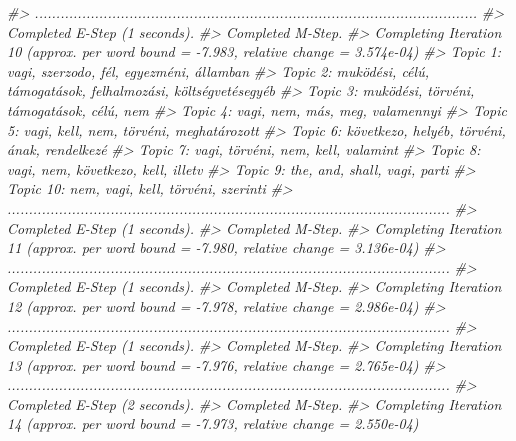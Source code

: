 \documentclass[
]{book}
\newenvironment{Shaded}{\begin{snugshade}}{\end{snugshade}}
\newcommand{\CommentTok}[1]{\textcolor[rgb]{0.56,0.35,0.01}{\textit{#1}}}
\begin{document}
\begin{Shaded}
\begin{Highlighting}[]
\CommentTok{\#\textgreater{} .......................................................................................................}
\CommentTok{\#\textgreater{} Completed E{-}Step (1 seconds). }
\CommentTok{\#\textgreater{} Completed M{-}Step. }
\CommentTok{\#\textgreater{} Completing Iteration 10 (approx. per word bound = {-}7.983, relative change = 3.574e{-}04) }
\CommentTok{\#\textgreater{} Topic 1: vagi, szerzodo, fél, egyezméni, államban }
\CommentTok{\#\textgreater{}  Topic 2: muködési, célú, támogatások, felhalmozási, költségvetésegyéb }
\CommentTok{\#\textgreater{}  Topic 3: muködési, törvéni, támogatások, célú, nem }
\CommentTok{\#\textgreater{}  Topic 4: vagi, nem, más, meg, valamennyi }
\CommentTok{\#\textgreater{}  Topic 5: vagi, kell, nem, törvéni, meghatározott }
\CommentTok{\#\textgreater{}  Topic 6: következo, helyéb, törvéni, ának, rendelkezé }
\CommentTok{\#\textgreater{}  Topic 7: vagi, törvéni, nem, kell, valamint }
\CommentTok{\#\textgreater{}  Topic 8: vagi, nem, következo, kell, illetv }
\CommentTok{\#\textgreater{}  Topic 9: the, and, shall, vagi, parti }
\CommentTok{\#\textgreater{}  Topic 10: nem, vagi, kell, törvéni, szerinti }
\CommentTok{\#\textgreater{} .......................................................................................................}
\CommentTok{\#\textgreater{} Completed E{-}Step (1 seconds). }
\CommentTok{\#\textgreater{} Completed M{-}Step. }
\CommentTok{\#\textgreater{} Completing Iteration 11 (approx. per word bound = {-}7.980, relative change = 3.136e{-}04) }
\CommentTok{\#\textgreater{} .......................................................................................................}
\CommentTok{\#\textgreater{} Completed E{-}Step (1 seconds). }
\CommentTok{\#\textgreater{} Completed M{-}Step. }
\CommentTok{\#\textgreater{} Completing Iteration 12 (approx. per word bound = {-}7.978, relative change = 2.986e{-}04) }
\CommentTok{\#\textgreater{} .......................................................................................................}
\CommentTok{\#\textgreater{} Completed E{-}Step (1 seconds). }
\CommentTok{\#\textgreater{} Completed M{-}Step. }
\CommentTok{\#\textgreater{} Completing Iteration 13 (approx. per word bound = {-}7.976, relative change = 2.765e{-}04) }
\CommentTok{\#\textgreater{} .......................................................................................................}
\CommentTok{\#\textgreater{} Completed E{-}Step (2 seconds). }
\CommentTok{\#\textgreater{} Completed M{-}Step. }
\CommentTok{\#\textgreater{} Completing Iteration 14 (approx. per word bound = {-}7.973, relative change = 2.550e{-}04) }

\end{Highlighting}
\end{Shaded}
\end{document}
